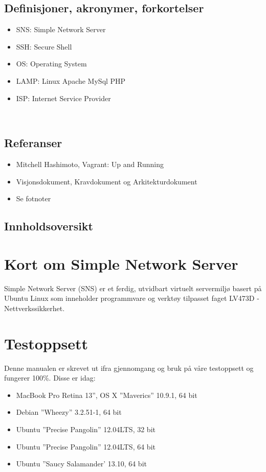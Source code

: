 \documentclass{article}
\begin{document}
\subsection{Definisjoner, akronymer, forkortelser}
\begin{itemize}
\item SNS: Simple Network Server
\item SSH: Secure Shell
\item OS: Operating System
\item LAMP: Linux Apache MySql PHP
\item ISP: Internet Service Provider
\end{itemize}
\\
\subsection{Referanser}
\begin{itemize}
\item{Mitchell Hashimoto, Vagrant: Up and Running}
\item Visjonsdokument, Kravdokument og Arkitekturdokument
\item Se fotnoter
\end{itemize}
\subsection{Innholdsoversikt}
\section{Kort om Simple Network Server}
Simple Network Server (SNS) er et ferdig, utvidbart virtuelt servermiljø basert på Ubuntu Linux som inneholder programmvare og verktøy tilpasset faget LV473D -Nettverkssikkerhet. 
\section{Testoppsett}
Denne manualen er skrevet ut ifra gjennomgang og bruk på våre testoppsett og fungerer 100\%. Disse er idag: 
\begin{itemize}
\item MacBook Pro Retina 13'', OS X  ''Maverics'' 10.9.1, 64 bit
\item Debian ''Wheezy'' 3.2.51-1, 64 bit
\item Ubuntu ''Precise Pangolin'' 12.04LTS, 32 bit
\item Ubuntu ''Precise Pangolin'' 12.04LTS, 64 bit
\item Ubuntu ''Saucy Salamander' 13.10, 64 bit
\end{itemize}
\end{document}
